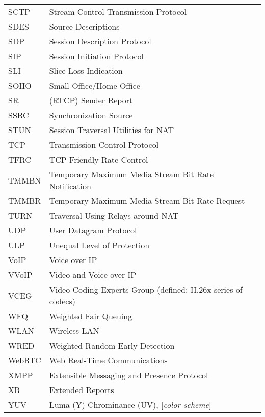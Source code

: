 \begin{longtable}{ll}
SCTP 	& Stream Control Transmission Protocol  \\
SDES	& Source Descriptions \\
SDP 	& Session Description Protocol \\
SIP 	& Session Initiation Protocol \\
SLI 	& Slice Loss Indication \\
SOHO 	& Small Office/Home Office \\
SR  	& (RTCP) Sender Report \\
SSRC	& Synchronization Source \\
STUN  	& Session Traversal Utilities for NAT \\
TCP 	& Transmission Control Protocol \\
TFRC 	& TCP Friendly Rate Control \\
TMMBN 	& Temporary Maximum Media Stream Bit Rate Notification \\
TMMBR 	& Temporary Maximum Media Stream Bit Rate Request \\
TURN  	& Traversal Using Relays around NAT \\
UDP 	& User Datagram Protocol \\
ULP 	& Unequal Level of Protection \\
VoIP 	& Voice over IP \\
VVoIP	& Video and Voice over IP \\
VCEG 	& Video Coding Experts Group (defined: H.26x series of codecs)\\
WFQ 	& Weighted Fair Queuing \\
WLAN	& Wireless LAN \\
WRED 	& Weighted Random Early Detection \\
WebRTC	& Web Real-Time Communications \\
XMPP 	& Extensible Messaging and Presence Protocol \\
XR  	& Extended Reports \\
YUV 	& Luma (Y) Chrominance (UV), [\textit{color scheme}] \\
\end{longtable}
